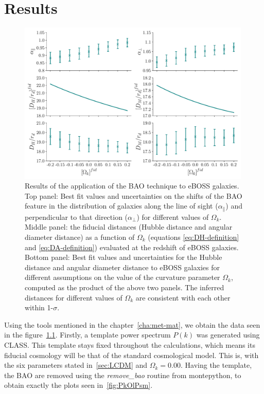 \chapter{Results}
\label{cha:results}


\begin{figure}[b]
	\centering
	\includegraphics[width=0.99\textwidth]{../figs/phase2_DA_DH_flat.pdf}
%
	\caption[Calculation of the cosmological observables for different fiducial cosmologies.]{Results of the application of the BAO technique to eBOSS galaxies. Top panel: Best fit values and uncertainties on the shifts of the BAO feature in the distribution of galaxies along the line of sight ($\alpha_\parallel$) and perpendicular to that direction ($\alpha_\perp$) for different values of $\Omega_k$. Middle panel: the fiducial distances (Hubble distance and angular diameter distance) as a function of $\Omega_k$ (equations \eqref{eq:DH-definition} and \eqref{eq:DA-definition}) evaluated at the redshift of eBOSS galaxies. Bottom panel: Best fit values and uncertainties for the Hubble distance and angular diameter distance to eBOSS galaxies for different assumptions on the value of the curvature parameter $\Omega_k$, computed as the product of the above two panels. The inferred distances for different values of $\Omega_k$ are consistent with each other within 1-$\sigma$.}
	\label{fig:DA_DH}
\end{figure}

Using the tools mentioned in the chapter~\ref{cha:met-mat}, we obtain the data seen in the figure~\ref{fig:DA_DH}. Firstly, a template power spectrum $P(k)$ was generated using CLASS. This template stays fixed throughout the calculations, which means its fiducial cosmology will be that of the standard cosmological model. This is, with the six parameters stated in~\ref{sec:LCDM} and $\Omega_k=0.00$. Having the template, the BAO are removed using the \textit{remove\_bao} routine from montepython, to obtain exactly the plots seen in~\ref{fig:PkOlPsm}. \\

